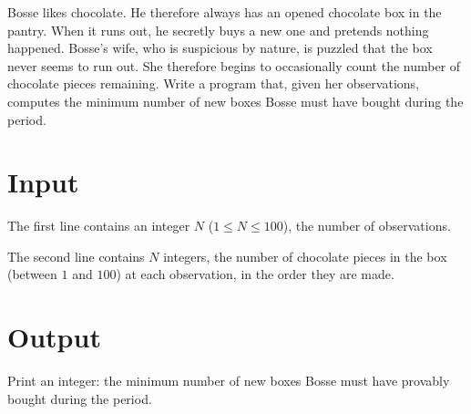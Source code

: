 Bosse likes chocolate.
He therefore always has an opened chocolate box in the pantry.
When it runs out, he secretly buys a new one and pretends nothing happened.
Bosse's wife, who is suspicious by nature, is puzzled that the box never seems to run out.
She therefore begins to occasionally count the number of chocolate pieces remaining.
Write a program that, given her observations, computes the minimum number of new boxes Bosse must have bought during the period.

\section*{Input}
The first line contains an integer $N$ ($1 \leq N \leq 100$), the number of observations.

The second line contains $N$ integers, the number of chocolate pieces in the box (between $1$ and $100$) at each observation, in the order they are made.

\section*{Output}
Print an integer: the minimum number of new boxes Bosse must have provably bought during the period.

